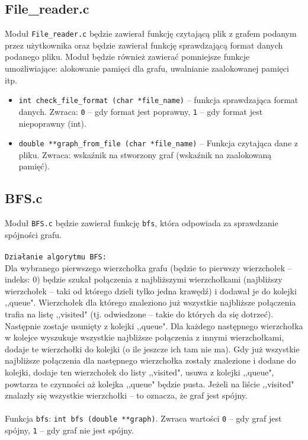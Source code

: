 \documentclass[12pt, a4paper]{article}
\begin{document}
\subsection{File\_reader.c}
Moduł \texttt{File\_reader.c} będzie zawierał funkcję czytającą plik z grafem podanym przez użytkownika oraz będzie zawierał funkcję sprawdzającą format danych podanego pliku. Moduł będzie również zawierać pomniejsze funkcje umożliwiające: alokowanie pamięci dla grafu, uwalnianie zaalokowanej pamięci itp.\\
\begin{itemize}
    \item \texttt{int check\_file\_format (char *file\_name)} -- funkcja sprawdzająca format danych. Zwraca: \texttt{0} -- gdy format jest poprawny, \texttt{1} -- gdy format jest niepoprawny (int).
    \item \texttt{double **graph\_from\_file (char *file\_name)} -- Funkcja czytająca dane z pliku. Zwraca: wskaźnik na stworzony graf (wskaźnik na zaalokowaną pamięć).

\end{itemize}


\subsection{BFS.c}
Moduł \texttt{BFS.c} będzie zawierał funkcję \texttt{bfs}, która odpowiada za sprawdzanie spójności grafu.\\\\
\texttt{Działanie algorytmu BFS:}\\
Dla wybranego pierwszego wierzchołka grafu (będzie to pierwszy wierzchołek -- indeks: 0) będzie szukał połączenia z najbliższymi wierzchołkami (najbliższy wierzchołek -- taki od którego dzieli tylko jedna krawędź) i dodawał je do kolejki ,,queue". Wierzchołek dla którego znaleziono już wszystkie najbliższe połączenia trafia na listę ,,visited" (tj. odwiedzone -- takie do których da się dotrzeć). Następnie zostaje usunięty z kolejki ,,queue". Dla każdego następnego wierzchołka w kolejce wyszukuje wszystkie najbliższe połączenia z innymi wierzchołkami, dodaje te wierzchołki do kolejki (o ile jeszcze ich tam nie ma). Gdy już wszystkie najbliższe połączenia dla następnego wierzchołka zostały znalezione i dodane do kolejki, dodaje ten wierzchołek do listy ,,visited", usuwa z kolejki ,,queue", powtarza te czynności aż kolejka ,,queue" będzie pusta. Jeżeli na liście ,,visited" znalazły się wszystkie wierzchołki -- to oznacza, że graf jest spójny.
\\\\
Funkcja \texttt{bfs}: \texttt{int bfs (double **graph)}. Zwraca wartości \texttt{0} -- gdy graf jest spójny, \texttt{1} -- gdy graf nie jest spójny.
\end{document}

